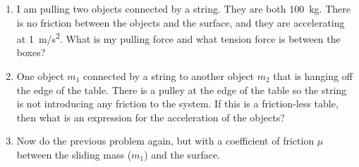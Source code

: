 \begin{enumerate}
\item I am pulling two objects connected by a string. They are both \SI{100}{\kilogram}. There is no friction between the objects and the surface, and they are accelerating at \SI{1}{\meter/\second^2}. What is my pulling force and what tension force is between the boxes?

\item One object $m_1$ connected by a string to another object $m_2$ that is hanging off the edge of the table. There is a pulley at the edge of the table so the string is not introducing any friction to the system. If this is a friction-less table, then what is an expression for the acceleration of the objects?

\item Now do the previous problem again, but with a coefficient of friction $\mu$ between the sliding mass ($m_1$) and the surface.



\end{enumerate}
